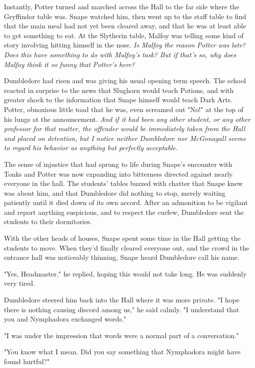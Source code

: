 Instantly, Potter turned and marched across the Hall to the far side where the Gryffindor table was. Snape watched him, then went up to the staff table to find that the main meal had not yet been cleared away, and that he was at least able to get something to eat. At the Slytherin table, Malfoy was telling some kind of story involving hitting himself in the nose. \emph{Is Malfoy the reason Potter was late? Does this have something to do with Malfoy's task? But if that's so, why does Malfoy think it so funny that Potter's here?}

Dumbledore had risen and was giving his usual opening term speech. The school reacted in surprise to the news that Slughorn would teach Potions, and with greater shock to the information that Snape himself would teach Dark Arts. Potter, obnoxious little toad that he was, even screamed out "No!" at the top of his lungs at the announcement. \emph{And if it had been any other student, or any other professor for that matter, the offender would be immediately taken from the Hall and placed on detention, but I notice neither Dumbledore nor McGonagall seems to regard his behavior as anything but perfectly acceptable.}

The sense of injustice that had sprung to life during Snape's encounter with Tonks and Potter was now expanding into bitterness directed against nearly everyone in the hall. The students' tables buzzed with chatter that Snape knew was about him, and that Dumbledore did nothing to stop, merely waiting patiently until it died down of its own accord. After an admonition to be vigilant and report anything suspicious, and to respect the curfew, Dumbledore sent the students to their dormitories.

With the other heads of houses, Snape spent some time in the Hall getting the students to move. When they'd finally cleared everyone out, and the crowd in the entrance hall was noticeably thinning, Snape heard Dumbledore call his name.

"Yes, Headmaster," he replied, hoping this would not take long. He was suddenly very tired.

Dumbledore steered him back into the Hall where it was more private. "I hope there is nothing causing discord among us," he said calmly. "I understand that you and Nymphadora exchanged words."

"I was under the impression that words were a normal part of a conversation."

"You know what I mean. Did you say something that Nymphadora might have found hurtful?"

